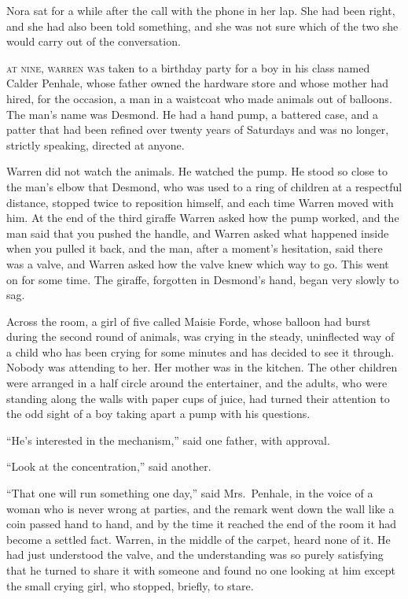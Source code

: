 Nora sat for a while after the call with the phone in her lap. She had been right, and she had also been told something, and she was not sure which of the two she would carry out of the conversation.


\textsc{at nine, warren was} taken to a birthday party for a boy in his class named Calder Penhale, whose father owned the hardware store and whose mother had hired, for the occasion, a man in a waistcoat who made animals out of balloons. The man's name was Desmond. He had a hand pump, a battered case, and a patter that had been refined over twenty years of Saturdays and was no longer, strictly speaking, directed at anyone.

Warren did not watch the animals. He watched the pump. He stood so close to the man's elbow that Desmond, who was used to a ring of children at a respectful distance, stopped twice to reposition himself, and each time Warren moved with him. At the end of the third giraffe Warren asked how the pump worked, and the man said that you pushed the handle, and Warren asked what happened inside when you pulled it back, and the man, after a moment's hesitation, said there was a valve, and Warren asked how the valve knew which way to go. This went on for some time. The giraffe, forgotten in Desmond's hand, began very slowly to sag.

Across the room, a girl of five called Maisie Forde, whose balloon had burst during the second round of animals, was crying in the steady, uninflected way of a child who has been crying for some minutes and has decided to see it through. Nobody was attending to her. Her mother was in the kitchen. The other children were arranged in a half circle around the entertainer, and the adults, who were standing along the walls with paper cups of juice, had turned their attention to the odd sight of a boy taking apart a pump with his questions.

``He's interested in the mechanism,'' said one father, with approval.

``Look at the concentration,'' said another.

``That one will run something one day,'' said Mrs.~Penhale, in the voice of a woman who is never wrong at parties, and the remark went down the wall like a coin passed hand to hand, and by the time it reached the end of the room it had become a settled fact. Warren, in the middle of the carpet, heard none of it. He had just understood the valve, and the understanding was so purely satisfying that he turned to share it with someone and found no one looking at him except the small crying girl, who stopped, briefly, to stare.

